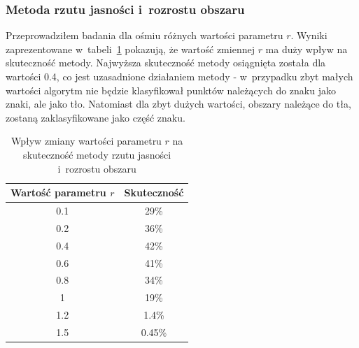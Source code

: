 \subsubsection{Metoda rzutu jasności i~rozrostu obszaru}
Przeprowadziłem badania dla ośmiu różnych wartości parametru $r$. Wyniki zaprezentowane w~tabeli~\ref{tab:rzut_jasnosci_rozrost_obszaru} pokazują, że wartość zmiennej $r$ ma duży wpływ na skuteczność metody. Najwyższa skuteczność metody osiągnięta została dla wartości 0.4, co jest uzasadnione działaniem metody - w~przypadku zbyt małych wartości algorytm nie będzie klasyfikował punktów należących do znaku jako znaki, ale jako tło. Natomiast dla zbyt dużych wartości, obszary należące do tła, zostaną zaklasyfikowane jako część znaku. 
\begin {table}
  \begin{center}
    \begin{tabular}{c | c}
      Wartość parametru $r$ & Skuteczność \\
      \hline
      0.1 & 29\% \\
      0.2 & 36\% \\
      0.4 & 42\% \\
      0.6 & 41\% \\
      0.8 & 34\% \\
      1 & 19\% \\
      1.2 & 1.4\%\\
      1.5 & 0.45\%
    \end{tabular}
    \caption {Wpływ zmiany wartości parametru $r$ na skuteczność metody rzutu jasności i~rozrostu obszaru}
    \label{tab:rzut_jasnosci_rozrost_obszaru} 
  \end{center}
\end {table}

